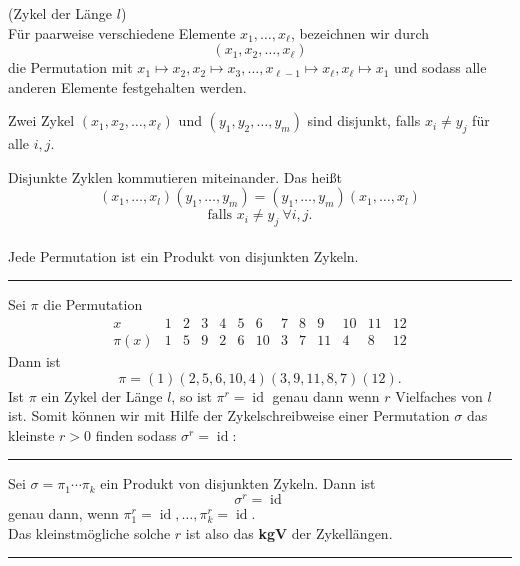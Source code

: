 \documentclass[9pt]{article}
\begin{document}
\begin{defi} (Zykel der Länge $l$) \\
 Für paarweise verschiedene Elemente $x_1, \dots, x_\ell$, bezeichnen wir durch
\[
(x_1, x_2, \dots, x_\ell)
\]
die Permutation mit $x_1 \mapsto x_2, x_2 \mapsto x_3, \dots, x_{\ell-1} \mapsto x_\ell, x_\ell \mapsto x_1$ und sodass alle anderen Elemente festgehalten werden.

Zwei Zykel $(x_1, x_2, \dots, x_\ell)$ und $(y_1, y_2, \dots, y_m)$ sind disjunkt, falls $x_i \neq y_j$ für alle $i, j$.

Disjunkte Zyklen kommutieren miteinander. Das heißt
\[
(x_1, \dots, x_l)(y_1, \dots, y_m) = (y_1, \dots, y_m)(x_1, \dots, x_l) 
\]
\[\text{falls } x_i \neq y_j \ \forall i, j.\]
 \\
Jede Permutation ist ein Produkt von disjunkten Zykeln. 
\end{defi} \noindent \rule{8cm}{0.4pt}

\begin{bsp}
Sei $\pi$ die Permutation
\[
\begin{array}{c|cccccccccccc}
x & 1 & 2 & 3 & 4 & 5 & 6 & 7 & 8 & 9 & 10 & 11 & 12 \\
\hline
\pi(x) & 1 & 5 & 9 & 2 & 6 & 10 & 3 & 7 & 11 & 4 & 8 & 12
\end{array}
\]
Dann ist
\[
\pi = (1)(2, 5, 6, 10, 4)(3, 9, 11, 8, 7)(12).
\]
Ist $\pi$ ein Zykel der Länge $l$, so ist $\pi^r = \operatorname{id}$ genau dann wenn $r$ Vielfaches von $l$ ist.
Somit können wir mit Hilfe der Zykelschreibweise einer Permutation $\sigma$ das kleinste $r > 0$ finden sodass $\sigma^r = \operatorname{id}$:
\end{bsp} \noindent \rule{8cm}{0.4pt}

\begin{satz}
Sei $\sigma = \pi_1 \cdots \pi_k$ ein Produkt von disjunkten Zykeln. Dann ist
\[
\sigma^r = \operatorname{id}
\]
genau dann, wenn $\pi_1^r = \operatorname{id}, \dots, \pi_k^r = \operatorname{id}$.  \\
Das kleinstmögliche solche $r$ ist also das \textbf{kgV} der Zykellängen.
 \end{satz} \noindent \rule{8cm}{0.4pt}
\end{document}
